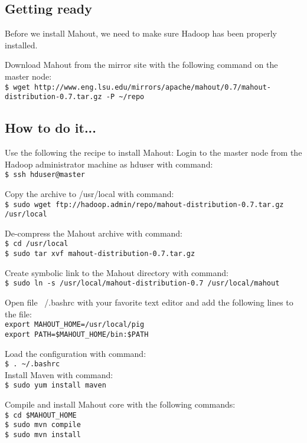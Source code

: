 \subsection*{Getting ready}
Before we install Mahout, we need to make sure Hadoop has been properly installed.

Download Mahout from the mirror site with the following command on the master node:\\
\verb|$ wget http://www.eng.lsu.edu/mirrors/apache/mahout/0.7/mahout-distribution-0.7.tar.gz -P ~/repo|

\subsection*{How to do it...}
Use the following the recipe to install Mahout:
Login to the master node from the Hadoop administrator machine as hduser with command: \\
\verb|$ ssh hduser@master|

Copy the archive to /usr/local with command: \\
\verb|$ sudo wget ftp://hadoop.admin/repo/mahout-distribution-0.7.tar.gz /usr/local|

De-compress the Mahout archive with command: \\
\verb|$ cd /usr/local| \\
\verb|$ sudo tar xvf mahout-distribution-0.7.tar.gz|

Create symbolic link to the Mahout directory with command: \\
\verb|$ sudo ln -s /usr/local/mahout-distribution-0.7 /usr/local/mahout |

Open file ~/.bashrc with your favorite text editor and add the following lines to the file: \\
\verb|export MAHOUT_HOME=/usr/local/pig| \\
\verb|export PATH=$MAHOUT_HOME/bin:$PATH|

Load the configuration with command: \\
\verb|$ . ~/.bashrc| \\

Install Maven with command: \\
\verb|$ sudo yum install maven|

Compile and install Mahout core with the following commands:\\
\verb|$ cd $MAHOUT_HOME| \\
\verb|$ sudo mvn compile| \\
\verb|$ sudo mvn install|

